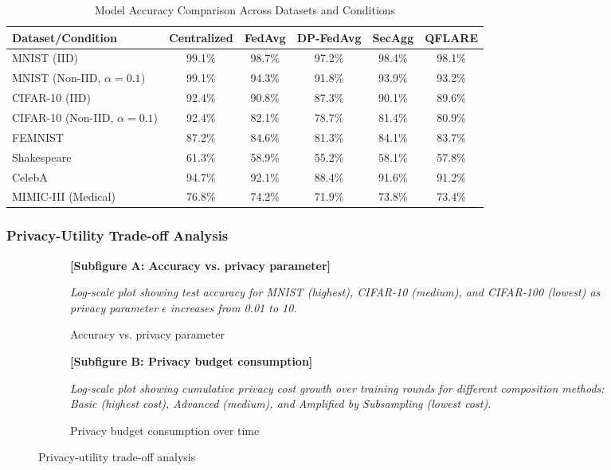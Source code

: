 \documentclass[journal]{IEEEtran}
\begin{document}
\begin{table}[htbp]
\centering
\caption{Model Accuracy Comparison Across Datasets and Conditions}
\begin{tabular}{|l|c|c|c|c|c|}
\hline
\textbf{Dataset/Condition} & \textbf{Centralized} & \textbf{FedAvg} & \textbf{DP-FedAvg} & \textbf{SecAgg} & \textbf{QFLARE} \\
\hline
MNIST (IID) & 99.1\% & 98.7\% & 97.2\% & 98.4\% & 98.1\% \\
MNIST (Non-IID, $\alpha=0.1$) & 99.1\% & 94.3\% & 91.8\% & 93.9\% & 93.2\% \\
CIFAR-10 (IID) & 92.4\% & 90.8\% & 87.3\% & 90.1\% & 89.6\% \\
CIFAR-10 (Non-IID, $\alpha=0.1$) & 92.4\% & 82.1\% & 78.7\% & 81.4\% & 80.9\% \\
FEMNIST & 87.2\% & 84.6\% & 81.3\% & 84.1\% & 83.7\% \\
Shakespeare & 61.3\% & 58.9\% & 55.2\% & 58.1\% & 57.8\% \\
CelebA & 94.7\% & 92.1\% & 88.4\% & 91.6\% & 91.2\% \\
MIMIC-III (Medical) & 76.8\% & 74.2\% & 71.9\% & 73.8\% & 73.4\% \\
\hline
\end{tabular}
\end{table}

\subsubsection{Privacy-Utility Trade-off Analysis}

\begin{figure}[htbp]
\centering
\begin{subfigure}{0.48\textwidth}
\textbf{[Subfigure A: Accuracy vs. privacy parameter]}

\textit{Log-scale plot showing test accuracy for MNIST (highest), CIFAR-10 (medium), and CIFAR-100 (lowest) as privacy parameter $\epsilon$ increases from 0.01 to 10.}
\caption{Accuracy vs. privacy parameter}
\end{subfigure}
\hfill
\begin{subfigure}{0.48\textwidth}
\textbf{[Subfigure B: Privacy budget consumption]}

\textit{Log-scale plot showing cumulative privacy cost growth over training rounds for different composition methods: Basic (highest cost), Advanced (medium), and Amplified by Subsampling (lowest cost).}
\caption{Privacy budget consumption over time}
\end{subfigure}
\caption{Privacy-utility trade-off analysis}
\end{figure}
\end{document}
